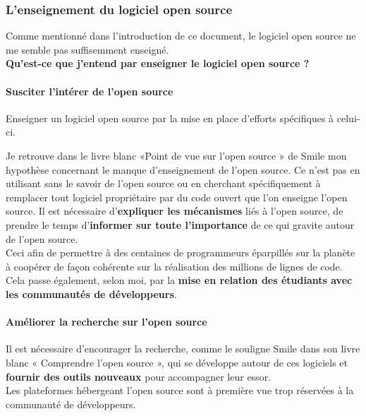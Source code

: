 			\subsubsection{L'enseignement du logiciel open source}

				Comme mentionné dans l'introduction de ce document, le logiciel open source ne me semble pas suffisemment enseigné.\\

				\textbf{Qu'est-ce que j'entend par enseigner le logiciel open source ?}

				\paragraph{Susciter l'intérer de l'open source\\}

					Enseigner un logiciel open source par la mise en place d'efforts spécifiques à celui-ci. 

					Je retrouve dans le livre blanc «Point de vue sur l'open source » de Smile mon hypothèse concernant le manque d'enseignement de l'open source. Ce n'est pas en utilisant sans le savoir de l'open source ou en cherchant spécifiquement à remplacer tout logiciel propriétaire par du code ouvert que l'on enseigne l'open source. Il est nécessaire d'\textbf{expliquer les mécanismes} liés à l'open source, de prendre le temps d'\textbf{informer sur toute l'importance} de ce qui gravite autour de l'open source.\\
					Ceci afin de permettre à des centaines de programmeurs éparpillés sur la planète à coopérer de façon cohérente sur la réalisation des millions de lignes de code.\\

					Cela passe également, selon moi, par la \textbf{mise en relation des étudiants avec les communautés de développeurs}.

				\paragraph{Améliorer la recherche sur l'open source\\}

					Il est nécessaire d'encourager la recherche, comme le souligne Smile dans son livre blanc « Comprendre l'open source », qui se développe autour de ces logiciels et \textbf{fournir des outils nouveaux} pour accompagner leur essor.\\

					Les plateformes hébergeant l'open source sont à première vue trop réservées à la communauté de développeurs.

